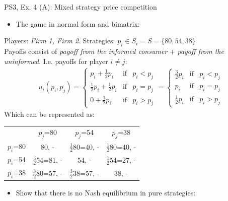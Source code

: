 \begin{frame}{PS3, Ex. 4 (A): Mixed strategy price competition}
    \begin{itemize}
      \item[(a)] The game in normal form and bimatrix:
    \end{itemize}
    Players: \textit{Firm 1, Firm 2}. Strategies: $p_i\in S_i = S = \{80, 54, 38\}$\\\medskip
    Payoffs consist of \textit{payoff from the informed consumer} + \textit{payoff from the uninformed}.
    I.e. payoffs for player $i\neq j$:
    \begin{align*}
      u_i(p_i,p_j)=
      \left\{ \begin{array}{rcl}
      p_i + \frac{1}{2}p_i & \mbox{if} & p_i < p_j \\
      \frac{1}{2}p_i + \frac{1}{2}p_i & \mbox{if} & p_i = p_j \\
      0 + \frac{1}{2}p_i & \mbox{if} & p_i > p_j
      \end{array}\right.
      =
      \left\{ \begin{array}{rcl}
      \frac{3}{2}p_i & \mbox{if} & p_i < p_j \\
                 p_i & \mbox{if} & p_i = p_j \\
      \frac{1}{2}p_i & \mbox{if} & p_i > p_j
      \end{array}\right.
    \end{align*}
    Which can be represented as:
      \vspace{-6pt}
      \begin{table}
        \begin{tabular}{c|c|c|c|}
          \multicolumn{1}{c}{} & \multicolumn{1}{c}{$p_j$=80} & \multicolumn{1}{c}{$p_j$=54} & \multicolumn{1}{c}{$p_j$=38} \\\cline{2-4}
          $p_i$=80 & 80, - & $\frac{1}{2}$80=40, - & $\frac{1}{2}$80=40, - \\\cline{2-4}
          $p_i$=54 & $\frac{3}{2}$54=81, - & 54, - & $\frac{1}{2}$54=27, - \\\cline{2-4}
          $p_i$=38 & $\frac{3}{2}$80=57, - & $\frac{3}{2}$38=57, - & 38, - \\\cline{2-4}
        \end{tabular}
      \end{table}
    \begin{itemize}
      \item[(b)] Show that there is no Nash equilibrium in pure strategies:
    \end{itemize}

\end{frame}
